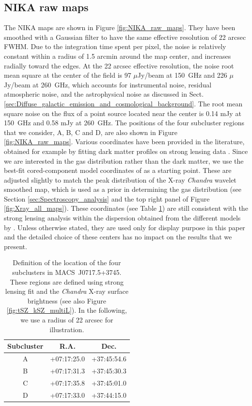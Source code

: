 \documentclass[twocolumn,traditabstract]{aa}
\begin{document}
\subsection{NIKA raw maps}\label{sec:NIKA_raw_maps}
The NIKA maps are shown in Figure \ref{fig:NIKA_raw_maps}. They have been smoothed with a Gaussian filter to have the same effective resolution of 22 arcsec FWHM. Due to the integration time spent per pixel, the noise is relatively constant within a radius of 1.5 arcmin around the map center, and increases radially toward the edges. At the 22 arcsec effective resolution, the noise root mean square at the center of the field is 97 $\mu$Jy/beam at 150~GHz and 226 $\mu$Jy/beam at 260~GHz, which accounts for instrumental noise, residual atmospheric noise, and the astrophysical noise as discussed in Sect.~ \ref{sec:Diffuse_galactic_emission_and_cosmological_background}. The root mean square noise on the flux of a point source located near the center is 0.14 mJy at 150~GHz and 0.58 mJy at 260~GHz. The positions of the four subcluster regions that we consider, A, B, C and D, are also shown in Figure \ref{fig:NIKA_raw_maps}. Various coordinates have been provided in the literature, obtained for example by fitting dark matter profiles on strong lensing data \citep[e.g.,][]{Limousin2012,Limousin2015}. Since we are interested in the gas distribution rather than the dark matter, we use the best-fit cored-component model coordinates of \cite{Limousin2015} as a starting point. These are adjusted slightly to match the peak distribution of the X-ray \textit{Chandra} wavelet smoothed map, which is used as a prior in determining the gas distribution (see Section \ref{sec:Spectroscopy_analysis} and the top right panel of Figure \ref{fig:Xray_all_maps}). These coordinates (see Table \ref{tab:coord_region}) are still consistent with the strong lensing analysis within the dispersion obtained from the different models by \cite{Limousin2015}. Unless otherwise stated, they are used only for display purpose in this paper and the detailed choice of these centers has no impact on the results that we present.

\begin{table}[]
\caption{\footnotesize{Definition of the location of the four subclusters in \mbox{MACS~J0717.5+3745}. These regions are defined using \cite{Limousin2015} strong lensing fit and the \textit{Chandra} X-ray surface brightness (see also Figure  \ref{fig:tSZ_kSZ_multiL}). In the following, we use a radius of 22 arcsec for illustration.}}
\begin{center}
\begin{tabular}{ccc}
\hline
\hline
Subcluster & R.A. & Dec. \\
\hline
A & +07:17:25.0 & +37:45:54.6 \\
B & +07:17:31.3 & +37:45:30.3 \\
C & +07:17:35.8 & +37:45:01.0 \\
D & +07:17:33.0 & +37:44:15.0 \\
\hline
\end{tabular}
\end{center}
\label{tab:coord_region}
\end{table}
\end{document}
